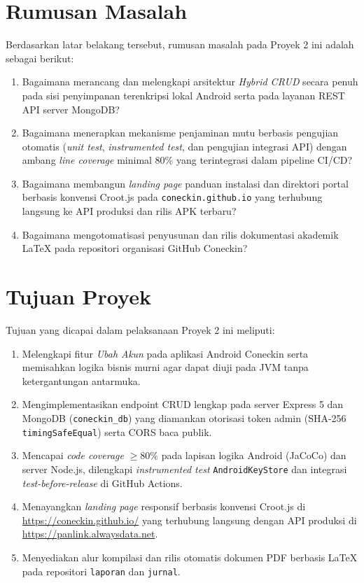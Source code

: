\section{Rumusan Masalah}
Berdasarkan latar belakang tersebut, rumusan masalah pada Proyek 2 ini adalah sebagai berikut:
\begin{enumerate}[leftmargin=*]
  \item Bagaimana merancang dan melengkapi arsitektur \textit{Hybrid CRUD} secara penuh pada sisi penyimpanan terenkripsi lokal Android serta pada layanan REST API server MongoDB?
  \item Bagaimana menerapkan mekanisme penjaminan mutu berbasis pengujian otomatis (\textit{unit test}, \textit{instrumented test}, dan pengujian integrasi API) dengan ambang \textit{line coverage} minimal 80\% yang terintegrasi dalam pipeline CI/CD?
  \item Bagaimana membangun \textit{landing page} panduan instalasi dan direktori portal berbasis konvensi Croot.js pada \texttt{coneckin.github.io} yang terhubung langsung ke API produksi dan rilis APK terbaru?
  \item Bagaimana mengotomatisasi penyusunan dan rilis dokumentasi akademik LaTeX pada repositori organisasi GitHub Coneckin?
\end{enumerate}

\section{Tujuan Proyek}
Tujuan yang dicapai dalam pelaksanaan Proyek 2 ini meliputi:
\begin{enumerate}[leftmargin=*]
  \item Melengkapi fitur \textit{Ubah Akun} pada aplikasi Android Coneckin serta memisahkan logika bisnis murni agar dapat diuji pada JVM tanpa ketergantungan antarmuka.
  \item Mengimplementasikan endpoint CRUD lengkap pada server Express 5 dan MongoDB (\texttt{coneckin\_db}) yang diamankan otorisasi token admin (SHA-256 \texttt{timingSafeEqual}) serta CORS baca publik.
  \item Mencapai \textit{code coverage} $\ge 80\%$ pada lapisan logika Android (JaCoCo) dan server Node.js, dilengkapi \textit{instrumented test} \texttt{AndroidKeyStore} dan integrasi \textit{test-before-release} di GitHub Actions.
  \item Menayangkan \textit{landing page} responsif berbasis konvensi Croot.js di \url{https://coneckin.github.io/} yang terhubung langsung dengan API produksi di \url{https://panlink.alwaysdata.net}.
  \item Menyediakan alur kompilasi dan rilis otomatis dokumen PDF berbasis LaTeX pada repositori \texttt{laporan} dan \texttt{jurnal}.
\end{enumerate}

